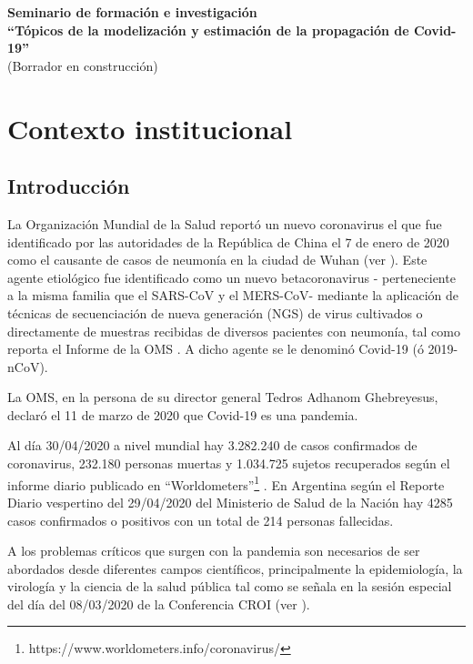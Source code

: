 \documentclass{article}
\begin{document}
\date{}

\begin{center}
 {\bf \large{Seminario de formación e investigación \\ ``Tópicos de la modelización y estimación de la propagación de Covid-19''
 		\\
 }}
\vspace{0.5cm}
(Borrador en construcción)
\end{center}





\section{Contexto institucional}



 \subsection{Introducción}

La Organización Mundial de la Salud reportó un nuevo coronavirus el que fue identificado por las autoridades de la República de China el 7 de enero de 2020 como el causante de casos de neumonía en la ciudad de Wuhan (ver \cite{chen2020mathematical}). Este agente etiológico fue identificado como un nuevo betacoronavirus - perteneciente a la misma familia que el  SARS-CoV y el MERS-CoV-  mediante la aplicación de técnicas de secuenciación de nueva generación (NGS) de virus cultivados o directamente de muestras recibidas de diversos pacientes con neumonía, tal como reporta el Informe de la OMS \cite{OMS1}. A dicho agente se le denominó   Covid-19 (ó 2019-nCoV).




La OMS, en la persona de su director general Tedros Adhanom Ghebreyesus, declaró el 11 de marzo de 2020 que  Covid-19 es una pandemia.


Al día   30/04/2020  a nivel mundial hay  3.282.240 de casos confirmados de coronavirus,   232.180  personas muertas y 1.034.725  sujetos recuperados según el informe diario publicado en  ``Worldometers''\footnote{https://www.worldometers.info/coronavirus/} . En Argentina según el Reporte Diario vespertino del   29/04/2020 del Ministerio de Salud de la Nación hay  4285 casos confirmados o positivos con un total de 214 personas fallecidas. 

A los problemas críticos que surgen con la pandemia son necesarios de ser abordados desde diferentes campos científicos, principalmente la epidemiología, la virología y  la ciencia de la salud pública tal como se señala en la sesión especial del día del 08/03/2020  de la Conferencia CROI   (ver \cite{croi}). 
\end{document}
